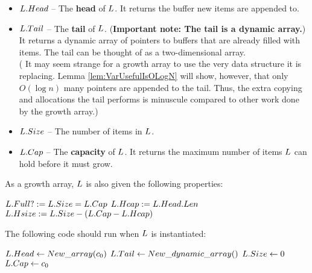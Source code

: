 \begin{itemize}
	\item $L.Head$ -- The \textbf{head} of $\VarList$. It returns the buffer new items are appended to.
	\item $L.Tail$ -- The \textbf{tail} of $\VarList$. (\textbf{Important note: The tail is a dynamic array.}) It returns a dynamic array of pointers to buffers that are already filled with items. The tail can be thought of as a two-dimensional array.\\
	({\HdrRemark} It may seem strange for a growth array to use the very data structure it is replacing. Lemma \ref{lem:VarUsefulIsOLogN} will show, however, that only $O(\log n)$ many pointers are appended to the tail. Thus, the extra copying and allocations the tail performs is minuscule compared to other work done by the growth array.)
	\item $L.Size$ -- The number of items in $\VarList$.
	\item $L.Cap$ -- The \textbf{capacity} of $\VarList$. It returns the maximum number of items $\VarList$ can hold before it must grow.
\end{itemize}

As a growth array, $\VarList$ is also given the following properties:

\begin{algorithm}
	\begin{algorithmic}
		\State $L.Full? := L.Size = L.Cap$
		\State
		\State $L.Hcap := L.Head.Len$
		\State
		\State $L.Hsize := L.Size - \left(L.Cap - L.Hcap\right)$
	\end{algorithmic}
\end{algorithm}

The following code should run when $\VarList$ is instantiated:

\begin{algorithm}
	\begin{algorithmic}
		\Procedure{$\FuncConstructor$}{$\VarList$}
			\State $L.Head \gets New\_array(c_0)$
			\State $L.Tail \gets New\_dynamic\_array()$
			\State $L.Size \gets 0$
			\State $L.Cap \gets c_0$
		\EndProcedure
	\end{algorithmic}
\end{algorithm}